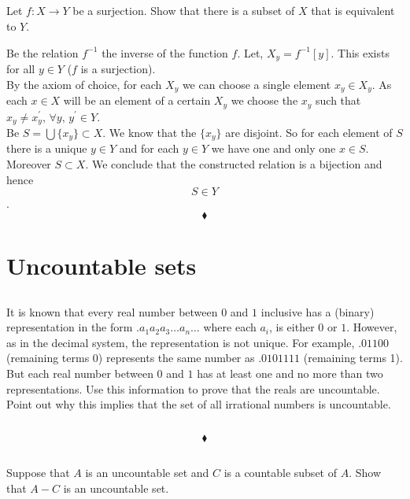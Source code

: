 \subsection{}
\begin{tcolorbox}
Let $f: X \rightarrow Y$ be a surjection. Show that there is a subset of $X$ that is equivalent to $Y$. 
\end{tcolorbox}
$$ $$
Be the relation $f^{-1}$ the inverse of the function $f$. Let, $X_y=f^{-1}[y]$. This exists for all $y\in Y$ ($f$ is a surjection).\\
By the axiom of choice, for each $X_y$ we can choose a single element  $x_y\in X_y$. As each $x\in X$ will be an element of a certain $X_y$ we choose the $x_y$ such that $x_y\ne x_y^{'},\, \forall y,\, y^{'}\in Y$.\\
Be $S=\bigcup\{x_y\}\subset X$. We know that the $\{x_y\}$ are disjoint. So for each element of $S$ there is a unique $y\in Y$ and for each $y\in Y$ we have one and only one $x\in S$. Moreover $S\subset X$. We conclude that the constructed relation is a bijection and hence
$$S\in Y$$.
$$\blacklozenge$$


\newpage

 \section{Uncountable sets}
\subsection{}
\begin{tcolorbox}
It is known that every real number between $0$ and $1$ inclusive has a (binary) representation in the form $.a_1 a_2 a_3 \dots a_n\dots$ where each $a_i$, is either $0$ or $1$. However, as in the decimal system, the representation is not unique. For example, $.01100$ (remaining terms 0) represents the same number as $.0101111$ (remaining terms 1). But each real number between $0$ and $1$ has at least one and no more than two representations. Use this information to prove that the reals are uncountable. Point out why this implies that the set of all irrational numbers is uncountable. 
\end{tcolorbox}
$$ $$

$$\blacklozenge$$

\subsection{}
\begin{tcolorbox}
Suppose that $A$ is an uncountable set and $C$ is a countable subset of $A$. Show that $A- C$ is an uncountable set. 

\end{tcolorbox}
$$ $$

